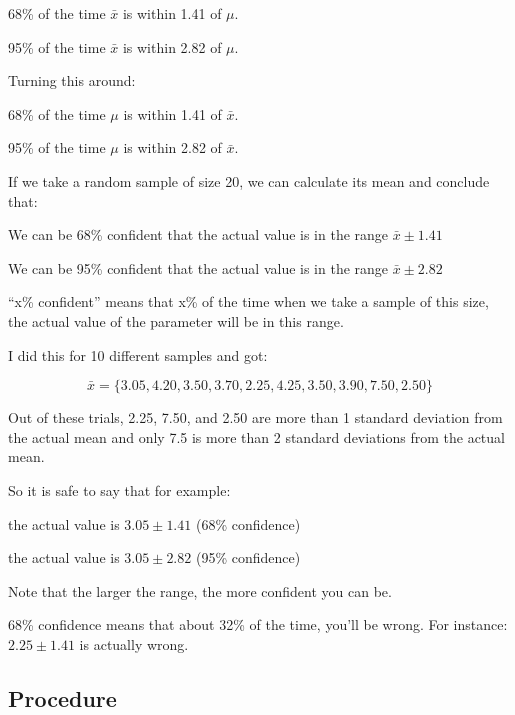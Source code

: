 \documentclass[letterpaper, landscape]{exam}
\begin{document}
  \begin{itemize*}
    \item 68\% of the time $\bar{x}$ is within 1.41 of $\mu$.
    \item 95\% of the time $\bar{x}$ is within 2.82 of $\mu$.
  \end{itemize*}

  Turning this around:
  \begin{itemize*}
    \item 68\% of the time $\mu$ is within 1.41 of $\bar{x}$.
    \item 95\% of the time $\mu$ is within 2.82 of $\bar{x}$.
  \end{itemize*}

  If we take a random sample of size 20, we can calculate its mean and conclude
  that:
  \begin{itemize*}
    \item We can be 68\% confident that the actual value is in the range
      $\bar{x} \pm 1.41$
    \item We can be 95\% confident that the actual value is in the range
      $\bar{x} \pm 2.82$
  \end{itemize*}

  ``x\% confident'' means that x\% of the time when we take a sample of this
  size, the actual value of the parameter will be in this range.

  I did this for 10 different samples and got:

  \[
    \bar{x} = \{ 3.05, 4.20, 3.50, 3.70, 2.25, 4.25, 3.50, 3.90, 7.50, 2.50 \}
  \]

  Out of these trials, 2.25, 7.50, and 2.50 are more than 1 standard deviation
  from the actual mean and only 7.5 is more than 2 standard deviations from the
  actual mean.

  So it is safe to say that for example:
  \begin{itemize*}
    \item the actual value is $3.05 \pm 1.41$ (68\% confidence)
    \item the actual value is $3.05 \pm 2.82$ (95\% confidence)
  \end{itemize*}

  Note that the larger the range, the more confident you can be. 
  
  68\% confidence means that about 32\% of the time, you'll be wrong. For
  instance: $2.25 \pm 1.41$ is actually wrong.

  \subsection{Procedure}
\end{document}
